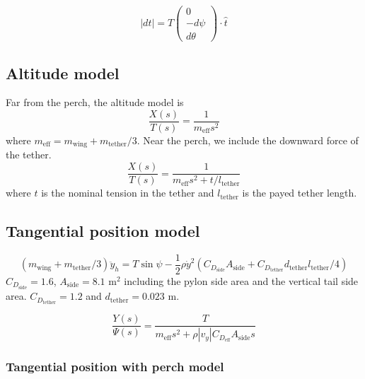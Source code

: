 \documentclass[11pt]{amsart}
\begin{document}
\begin{equation}
|dt| = T \left(
\begin{array}{c}
0 \\
-d\psi \\
d\theta
\end{array}
\right) \cdot \hat{t}
\end{equation}


\subsection{Altitude model}

Far from the perch, the altitude model is
\begin{equation}
\frac{X(s)}{T(s)} =
\frac{1}{m_{\mathrm{eff}} s^2}
\end{equation}
where $m_{\mathrm{eff}} = m_{\mathrm{wing}} + m_{\mathrm{tether}}/3$.
Near the perch, we include the downward force of the tether.
\begin{equation}
\frac{X(s)}{T(s)} =
\frac{1}{m_{\mathrm{eff}} s^2 + t / l_{\mathrm{tether}}}
\end{equation}
where $t$ is the nominal tension in the tether and
$l_{\mathrm{tether}}$ is the payed tether length.

\subsection{Tangential position model}

\begin{equation}
(m_{\mathrm{wing}} + m_{\mathrm{tether}}/3) \ddot{y}_h = T \sin \psi -
\frac{1}{2} \rho \dot{y}^2 (C_{D_{\mathrm{side}}} A_{\mathrm{side}} +
C_{D_{\mathrm{tether}}} d_{\mathrm{tether}} l_{\mathrm{tether}}/4)
\end{equation}
$C_{D_{\mathrm{side}}} = 1.6$, $A_{\mathrm{side}} = 8.1$ m$^2$ including
the pylon side area and the vertical tail side area.
$C_{D_{\mathrm{tether}}} = 1.2$ and $d_{\mathrm{tether}} = 0.023$ m.

\begin{equation}
\frac{Y(s)}{\Psi(s)} =
\frac{T}{m_{\mathrm{eff}} s^2 + \rho |v_y| C_{D_{\mathrm{eff}}} A_{\mathrm{side}} s}
\end{equation}

\subsubsection{Tangential position with perch model}
\end{document}
